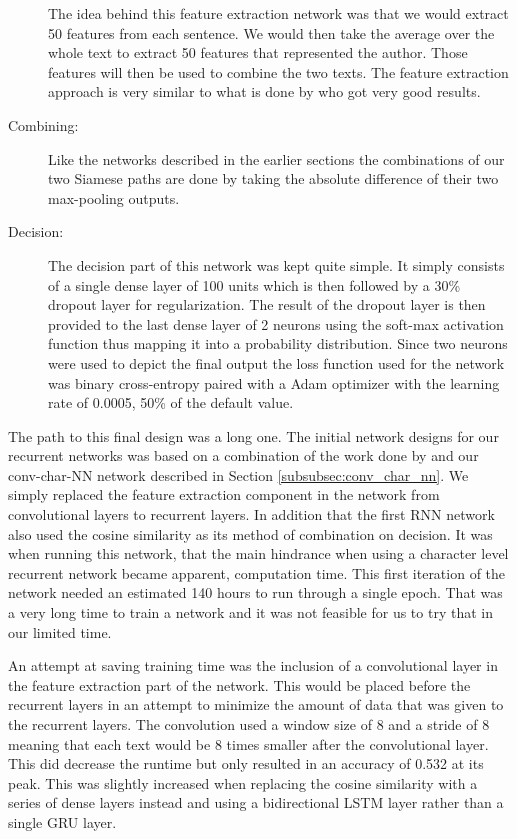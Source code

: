 \begin{description}
        The idea behind this feature extraction network was that we would
        extract 50 features from each sentence. We would then take the average
        over the whole text to extract 50 features that represented the author.
        Those features will then be used to combine the two texts. The feature
        extraction approach is very similar to what is done by
        \citet{qian:2018} who got very good results.

    \item[Combining:]

        Like the networks described in the earlier sections the combinations
        of our two Siamese paths are done by taking the absolute difference
        of their two max-pooling outputs.

    \item[Decision:]

        The decision part of this network was kept quite simple. It simply
        consists of a single dense layer of 100 units which is then followed
        by a 30\% dropout layer for regularization. The result of the dropout
        layer is then provided to the last dense layer of 2 neurons using
        the soft-max activation function thus mapping it into a probability
        distribution. Since two neurons were used to depict the final output
        the loss function used for the network was binary cross-entropy paired
        with a \gls{Adam} optimizer with the learning rate of 0.0005, 50\% of
        the default value.

\end{description}

The path to this final design was a long one. The initial network designs
for our recurrent networks was based on a combination of the work done by
\citet{qian:2018} and our \gls{conv-char-NN} network described in Section
\ref{subsubsec:conv_char_nn}. We simply replaced the feature extraction
component in the network from convolutional layers to recurrent layers. In
addition that the first \gls{RNN} network also used the cosine similarity as its
method of combination on decision. It was when running this network, that the
main hindrance when using a character level recurrent network became apparent,
computation time. This first iteration of the network needed an estimated 140
hours to run through a single epoch. That was a very long time to train a
network and it was not feasible for us to try that in our limited time.

An attempt at saving training time was the inclusion of a convolutional layer
in the feature extraction part of the network. This would be placed before the
recurrent layers in an attempt to minimize the amount of data that was given to
the recurrent layers. The convolution used a window size of 8 and a stride of 8
meaning that each text would be 8 times smaller after the convolutional layer.
This did decrease the runtime but only resulted in an accuracy of 0.532 at its
peak. This was slightly increased when replacing the cosine similarity with a
series of dense layers instead and using a bidirectional \gls{LSTM} layer rather
than a single \gls{GRU} layer.

